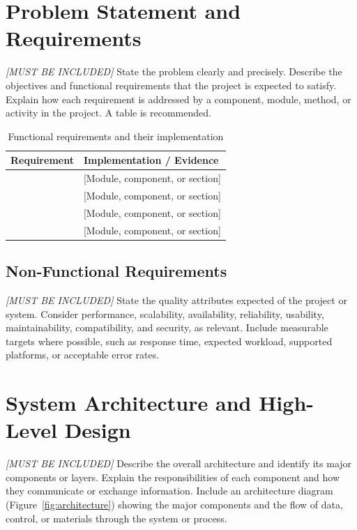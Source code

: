 \documentclass[manuscript,screen,review]{acmart}
\begin{document}
\section{Problem Statement and Requirements}
\label{sec:requirements}
\textit{[MUST BE INCLUDED]}
State the problem clearly and precisely. Describe the objectives and
functional requirements that the project is expected to satisfy.
Explain how each requirement is addressed by a component, module,
method, or activity in the project. A table is recommended.

\begin{table}[htbp]
  \caption{Functional requirements and their implementation}
  \label{tab:requirements}
  \small
  \begin{tabularx}{\columnwidth}{@{}p{}L@{}}
    \toprule
    \textbf{Requirement} & \textbf{Implementation / Evidence} \\
    \midrule
    [Requirement 1] & [Module, component, or section] \\
    [Requirement 2] & [Module, component, or section] \\
    [Requirement 3] & [Module, component, or section] \\
    [Requirement 4] & [Module, component, or section] \\
    \bottomrule
  \end{tabularx}
\end{table}

\subsection{Non-Functional Requirements}
\textit{[MUST BE INCLUDED]}
State the quality attributes expected of the project or system.
Consider performance, scalability, availability, reliability, usability,
maintainability, compatibility, and security, as relevant. Include
measurable targets where possible, such as response time, expected
workload, supported platforms, or acceptable error rates.

\section{System Architecture and High-Level Design}
\label{sec:architecture}
\textit{[MUST BE INCLUDED]}
Describe the overall architecture and identify its major components
or layers. Explain the responsibilities of each component and how
they communicate or exchange information. Include an architecture
diagram (Figure~\ref{fig:architecture}) showing the major components
and the flow of data, control, or materials through the system or
process.
\end{document}
